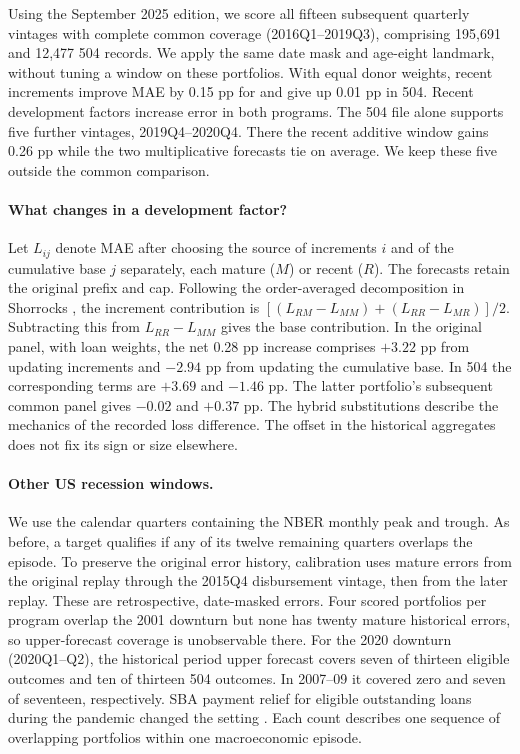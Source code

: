 Using the September 2025 edition, we score all fifteen subsequent quarterly vintages with complete common coverage (2016Q1--2019Q3), comprising 195,691 \sba{} and 12,477 504 records. We apply the same date mask and age-eight landmark, without tuning a window on these portfolios. With equal donor weights, recent increments improve MAE by 0.15 pp for \sba{} and give up 0.01 pp in 504. Recent development factors increase error in both programs. The 504 file alone supports five further vintages, 2019Q4--2020Q4. There the recent additive window gains 0.26 pp while the two multiplicative forecasts tie on average. We keep these five outside the common comparison.

\paragraph{What changes in a development factor?}
Let $L_{ij}$ denote MAE after choosing the source of increments $i$ and of the cumulative base $j$ separately, each mature ($M$) or recent ($R$). The forecasts retain the original prefix and cap. Following the order-averaged decomposition in Shorrocks \cite{shorrocks}, the increment contribution is $[(L_{RM}-L_{MM})+(L_{RR}-L_{MR})]/2$. Subtracting this from $L_{RR}-L_{MM}$ gives the base contribution. In the original \sba{} panel, with loan weights, the net 0.28 pp increase comprises $+3.22$ pp from updating increments and $-2.94$ pp from updating the cumulative base. In 504 the corresponding terms are $+3.69$ and $-1.46$ pp. The latter portfolio's subsequent common panel gives $-0.02$ and $+0.37$ pp. The hybrid substitutions describe the mechanics of the recorded loss difference. The offset in the historical aggregates does not fix its sign or size elsewhere.

\paragraph{Other US recession windows.}
We use the calendar quarters containing the NBER monthly peak and trough. As before, a target qualifies if any of its twelve remaining quarters overlaps the episode. To preserve the original error history, calibration uses mature errors from the original replay through the 2015Q4 disbursement vintage, then from the later replay. These are retrospective, date-masked errors. Four scored portfolios per program overlap the 2001 downturn but none has twenty mature historical errors, so upper-forecast coverage is unobservable there. For the 2020 downturn (2020Q1--Q2), the historical period upper forecast covers seven of thirteen eligible \sba{} outcomes and ten of thirteen 504 outcomes. In 2007--09 it covered zero and seven of seventeen, respectively. SBA payment relief for eligible outstanding loans during the pandemic changed the setting \cite{relief}. Each count describes one sequence of overlapping portfolios within one macroeconomic episode.
